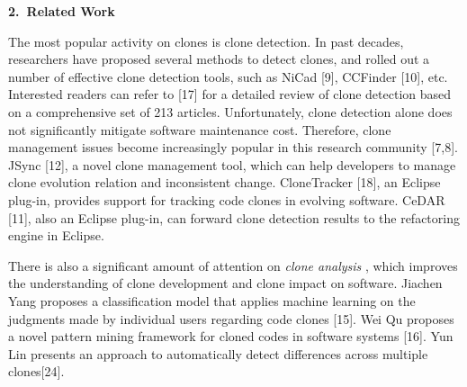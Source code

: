 \begin{center}{\large\bf 2.\ Related Work}\end{center}


The most popular activity on clones is clone detection. In past decades, researchers have proposed several methods to detect clones, and rolled out a number of effective clone detection tools, such as NiCad [9], CCFinder [10], etc. %
Interested readers can refer to [17] for a detailed review of clone detection based on a comprehensive set of 213 articles. Unfortunately, clone detection alone does not significantly mitigate software maintenance cost. Therefore, clone management issues become increasingly popular in this research community [7,8]. %
JSync [12], a novel clone management tool, which can help developers to manage clone evolution relation and inconsistent change. CloneTracker [18], an Eclipse plug-in, provides support for tracking code clones in evolving software. CeDAR [11], also an Eclipse plug-in, can forward clone detection results to the refactoring engine in Eclipse. 

There is also a significant amount of attention on {\em clone analysis}%
, which improves the understanding of clone development and clone impact on software. %
Jiachen Yang proposes a classification model that applies machine learning on the judgments made by individual users regarding code clones [15]. Wei Qu proposes a novel pattern mining framework for cloned codes in software systems [16]. %
Yun Lin presents an approach to automatically detect differences across multiple clones[24].%

